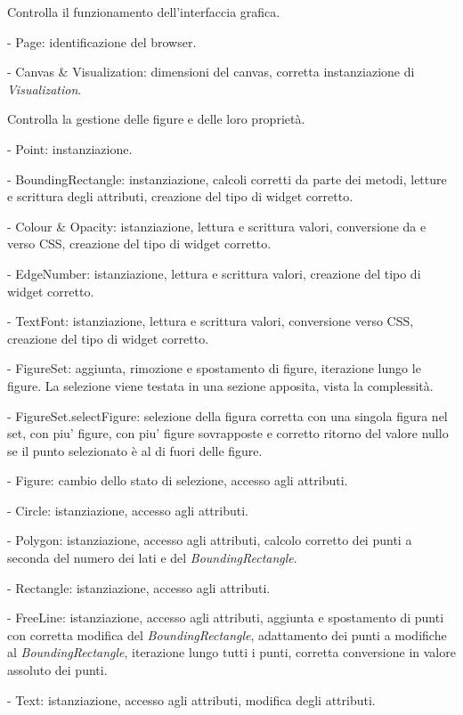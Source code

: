 Controlla il funzionamento dell'interfaccia grafica.
\begin{elencopuntato}[\subsubsecindent]
\item[-] Page: identificazione del browser.
\item[-] Canvas \& Visualization: dimensioni del canvas, corretta instanziazione di \textit{Visualization}.
\end{elencopuntato}
Controlla la gestione delle figure e delle loro propriet\`a.
\begin{elencopuntato}[\subsubsecindent]
\item[-] Point: instanziazione.
\item[-] BoundingRectangle: instanziazione, calcoli corretti da parte dei metodi, letture e scrittura degli attributi, creazione del tipo di widget corretto.
\item[-] Colour \& Opacity: istanziazione, lettura e scrittura valori, conversione da e verso CSS, creazione del tipo di widget corretto.
\item[-] EdgeNumber: istanziazione, lettura e scrittura valori, creazione del tipo di widget corretto.
\item[-] TextFont: istanziazione, lettura e scrittura valori, conversione verso CSS, creazione del tipo di widget corretto.
\item[-] FigureSet: aggiunta, rimozione e spostamento di figure, iterazione lungo le figure. La selezione viene testata in una sezione apposita, vista la complessit\`a.
\item[-] FigureSet.selectFigure: selezione della figura corretta con una singola figura nel set, con piu' figure, con piu' figure sovrapposte e corretto ritorno del valore nullo se il punto selezionato \`e al di fuori delle figure.
\item[-] Figure: cambio dello stato di selezione, accesso agli attributi.
\item[-] Circle: istanziazione, accesso agli attributi.
\item[-] Polygon: istanziazione, accesso agli attributi, calcolo corretto dei punti a seconda del numero dei lati e del \textit{BoundingRectangle}.
\item[-] Rectangle: istanziazione, accesso agli attributi.
\item[-] FreeLine: istanziazione, accesso agli attributi, aggiunta e spostamento di punti con corretta modifica del \textit{BoundingRectangle}, adattamento dei punti a modifiche al \textit{BoundingRectangle}, iterazione lungo tutti i punti, corretta conversione in valore assoluto dei punti.
\item[-] Text: istanziazione, accesso agli attributi, modifica degli attributi.
\end{elencopuntato}

